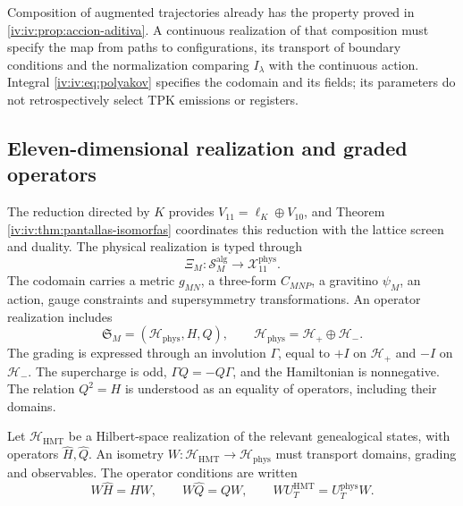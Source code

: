 Composition of augmented trajectories already has the
property proved in \ref{iv:iv:prop:accion-aditiva}.
A continuous realization of that composition must
specify the map from paths to configurations,
its transport of boundary conditions and the
normalization comparing \(I_\lambda\) with the continuous
action. Integral \eqref{iv:iv:eq:polyakov} specifies
the codomain and its fields; its parameters do not
retrospectively select TPK emissions or registers.

\subsection{Eleven-dimensional realization and graded operators}

The reduction directed by \(K\) provides
\(V_{11}=\ell_K\oplus V_{10}\), and Theorem
\ref{iv:iv:thm:pantallas-isomorfas} coordinates this reduction
with the lattice screen and duality. The physical
realization is typed through
\[
 \Xi_M:\mathscr S_M^{\mathrm{alg}}
                  \longrightarrow\mathcal X_{11}^{\mathrm{phys}}.
\]
The codomain carries a metric \(g_{MN}\), a three-form
\(C_{MNP}\), a gravitino \(\psi_M\), an action,
gauge constraints and supersymmetry
transformations. An operator realization includes
\[
 \mathfrak S_M=(\mathcal H_{\mathrm{phys}},H,Q),\qquad
 \mathcal H_{\mathrm{phys}}=\mathcal H_+\oplus\mathcal H_-.
\]
The grading is expressed through an involution
\(\Gamma\), equal to \(+I\) on \(\mathcal H_+\)
and \(-I\) on \(\mathcal H_-\). The supercharge
is odd, \(\Gamma Q=-Q\Gamma\), and the
Hamiltonian is nonnegative. The relation
\(Q^2=H\) is understood as an equality of operators,
including their domains.

Let \(\mathcal H_{\mathrm{HMT}}\) be a Hilbert-space realization
of the relevant genealogical states,
with operators \(\widehat H,\widehat Q\). An
isometry \(W:\mathcal H_{\mathrm{HMT}}\to
\mathcal H_{\mathrm{phys}}\) must transport
domains, grading and observables. The operator
conditions are written
\begin{equation}
 W\widehat H=HW,\qquad
 W\widehat Q=QW,\qquad
 WU_T^{\mathrm{HMT}}=U_T^{\mathrm{phys}}W.
 \label{iv:iv:eq:entrelazamiento-fisico}
\end{equation}

